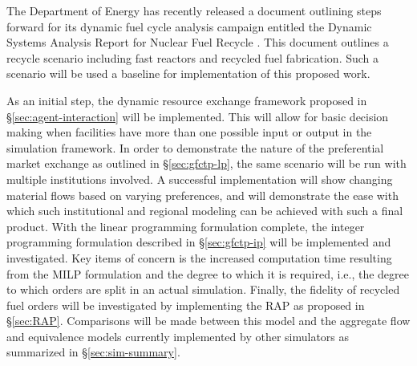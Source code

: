 The Department of Energy has recently released a document outlining steps forward
for its dynamic fuel cycle analysis campaign entitled the Dynamic Systems
Analysis Report for Nuclear Fuel Recycle \cite{dixon_dynamic_2008}. This
document outlines a recycle scenario including fast reactors and recycled fuel
fabrication. Such a scenario will be used a baseline for implementation of this
proposed work.

As an initial step, the dynamic resource exchange framework proposed in
\S\ref{sec:agent-interaction} will be implemented. This will allow for basic
decision making when facilities have more than one possible input or output in
the \Cyclus simulation framework. In order to demonstrate the nature of the
preferential market exchange as outlined in \S\ref{sec:gfctp-lp}, the same
scenario will be run with multiple institutions involved. A successful
implementation will show changing material flows based on varying preferences,
and will demonstrate the ease with which such institutional and regional
modeling can be achieved with such a final product. With the linear programming
formulation complete, the integer programming formulation described in
\S\ref{sec:gfctp-ip} will be implemented and investigated. Key items of concern
is the increased computation time resulting from the MILP formulation and the
degree to which it is required, i.e., the degree to which orders are split in an
actual simulation. Finally, the fidelity of recycled fuel orders will be
investigated by implementing the RAP as proposed in \S\ref{sec:RAP}. Comparisons
will be made between this model and the aggregate flow and equivalence models
currently implemented by other simulators as summarized in
\S\ref{sec:sim-summary}.
